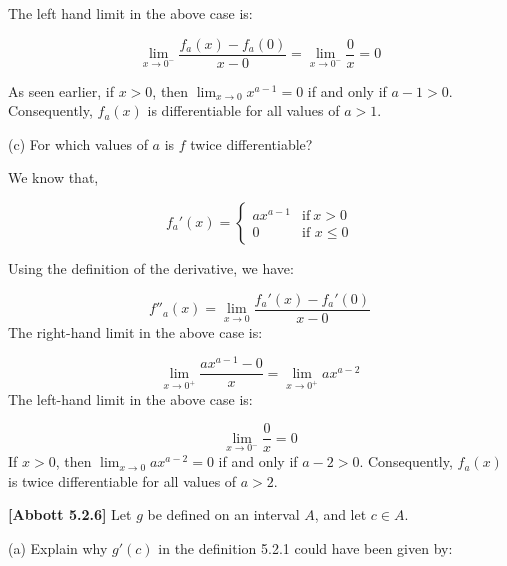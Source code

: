 \documentclass[10pt]{article}
\begin{document}
The left hand limit in the above case is:


\begin{equation*}
\lim _{x\rightarrow 0^{-}}\frac{f_{a}( x) -f_{a}( 0)}{x-0} =\lim _{x\rightarrow 0^{-}}\frac{0}{x} =0
\end{equation*}


As seen earlier, if $\displaystyle x >0$, then $\displaystyle \lim _{x\rightarrow 0} x^{a-1} =0$ if and only if $\displaystyle a-1 >0$. Consequently, $\displaystyle f_{a}( x)$ is differentiable for all values of $\displaystyle a >1$.



(c) For which values of $\displaystyle a$ is $\displaystyle f$ twice differentiable?



We know that, 


\begin{equation*}
f_{a} '( x) =\begin{cases}
ax^{a-1} & \text{if} \ x >0\\
0 & \text{if } x\leq 0
\end{cases}
\end{equation*}


Using the definition of the derivative, we have:


\begin{equation*}
f''_{a}( x) =\lim _{x\rightarrow 0}\frac{f_{a} '( x) -f_{a} '( 0)}{x-0}
\end{equation*}
The right-hand limit in the above case is:


\begin{equation*}
\lim _{x\rightarrow 0^{+}}\frac{ax^{a-1} -0}{x} =\lim _{x\rightarrow 0^{+}} ax^{a-2}
\end{equation*}
The left-hand limit in the above case is:


\begin{equation*}
\lim _{x\rightarrow 0^{-}}\frac{0}{x} =0
\end{equation*}
If $\displaystyle x >0$, then $\displaystyle \lim _{x\rightarrow 0} ax^{a-2} =0$ if and only if $\displaystyle a-2 >0$. Consequently, $\displaystyle f_{a}( x)$ is twice differentiable for all values of $\displaystyle a >2$.



\textbf{[Abbott 5.2.6]} Let $\displaystyle g$ be defined on an interval $\displaystyle A$, and let $\displaystyle c\in A$.



(a) Explain why $\displaystyle g'( c)$ in the definition 5.2.1 could have been given by:
\end{document}
